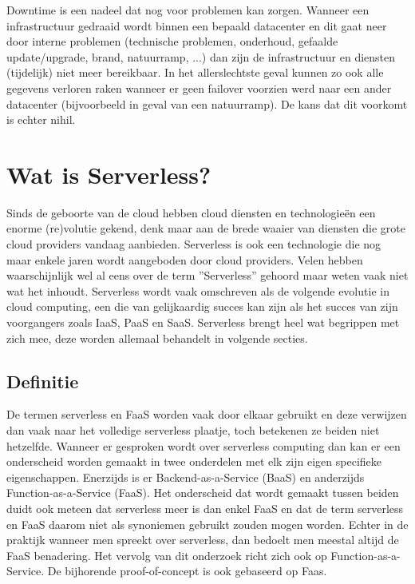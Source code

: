 \begin{description}[style=unboxed, labelwidth=\linewidth, listparindent =0pt]
        \item [Downtime]
        Downtime is een nadeel dat nog voor problemen kan zorgen. Wanneer een infrastructuur gedraaid wordt binnen een bepaald datacenter en dit gaat neer door interne problemen (technische problemen, onderhoud, gefaalde update/upgrade, brand, natuurramp, ...) dan zijn de infrastructuur en diensten (tijdelijk) niet meer bereikbaar. In het allerslechtste geval kunnen zo ook alle gegevens verloren raken wanneer er geen failover voorzien werd naar een ander datacenter (bijvoorbeeld in geval van een natuurramp). De kans dat dit voorkomt is echter nihil.
\end{description}
\newpage

\section{Wat is Serverless?}
Sinds de geboorte van de cloud hebben cloud diensten en technologieën een enorme (re)volutie gekend, denk maar aan de brede waaier van diensten die grote cloud providers vandaag aanbieden. Serverless  is ook een technologie die nog maar enkele jaren wordt aangeboden door cloud providers. Velen hebben waarschijnlijk wel al eens over de term ''Serverless'' gehoord maar weten vaak niet wat het inhoudt. Serverless wordt vaak omschreven als de volgende evolutie in cloud computing, een die van gelijkaardig succes kan zijn als het succes van zijn voorgangers zoals IaaS, PaaS en SaaS. Serverless brengt heel wat begrippen met zich mee, deze worden allemaal behandelt in volgende secties.
 
\subsection{Definitie}
De termen serverless en FaaS worden vaak door elkaar gebruikt en deze verwijzen dan vaak naar het volledige serverless plaatje, toch betekenen ze beiden niet hetzelfde. Wanneer er gesproken wordt over serverless computing dan kan er een onderscheid worden gemaakt in twee onderdelen met elk zijn eigen specifieke eigenschappen. Enerzijds is er Backend-as-a-Service (BaaS) en anderzijds Function-as-a-Service (FaaS). Het onderscheid dat wordt gemaakt tussen beiden duidt ook meteen dat serverless meer is dan enkel FaaS en dat de term serverless en FaaS daarom niet als synoniemen gebruikt zouden mogen worden. Echter in de praktijk wanneer men spreekt over serverless, dan bedoelt men meestal altijd de FaaS benadering. Het vervolg van dit onderzoek richt zich ook op Function-as-a-Service. De bijhorende proof-of-concept is ook gebaseerd op Faas.\autocite{Roberts2017}

